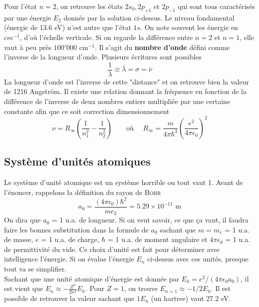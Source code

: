 	Pour l'état $n=2$, on retrouve les états $2s_0, 2p_{+1}$ et $2p_{-1}$ qui sont tous caractérisés par
	une énergie $E_2$ donnée par la solution ci-dessus. Le niveau fondamental (énergie de 13.6 eV) n'est 
	autre que l'état $1s$. On note souvent les énergie en $cm^{-1}$, d'où l'échelle verticale. Si on regarde
	la différence entre $n=2$ et $n=1$, elle vaut à peu près $100'000$ cm$^{-1}$. Il s'agit du \textbf{
	nombre d'onde} défini comme l'inverse de la longueur d'onde. Plusieurs écritures sont possibles
	\begin{equation}
	\frac{1}{\lambda}\equiv \bar\lambda = \sigma = \bar\nu
	\end{equation}
	La longueur d'onde est l'inverse de cette "distance" et on retrouve bien la valeur de 1216 Angström. 
	Il existe une relation donnant la fréquence en fonction de la différence de l'inverse de deux nombres 
	entiers multipliée par une certaine constante afin que ce soit correction dimensionnement
	\begin{equation}
	\nu = R_\infty\left(\frac{1}{n_1^2}-\frac{1}{n_2^2}\right)\qquad\text{où }\quad R_\infty = \frac{m}{
	4\pi\hbar^3}\left(\frac{e^2}{4\pi\epsilon_0}\right)^2
	\end{equation}
	

\subsection{Système d'unités atomiques}
Le système d'unité atomique est un système horrible ou tout vaut 1. Avant de l'énoncer, rappelons la 
définition du rayon de \textsc{Bohr}
\begin{equation}
a_0=\frac{(4\pi\epsilon_0)\hbar^2}{me_2} = 5.29\times 10^{-11}\text{ m}
\end{equation}
On dira que $a_0$ = 1 u.a. de longueur. Si on veut savoir, ce que ça vaut, il faudra faire les bonnes
substitution dans la formule de $a_0$ sachant que
$m=m_e$ = 1 u.a. de masse, $e$ = 1 u.a. de charge, $\hbar$ = 1 u.a. de moment angulaire et $4\pi\epsilon_0$ =
1 u.a.  de permittivité du vide. Ce choix d'unité est fait pour déterminer avec intelligence l'énergie. Si on 
évalue l'énergie $E_n$ ci-dessus avec ces unités, presque tout va se simplifier.\\

Sachant que une unité atomique d'énergie est donnée par $E_h = e^2/(4\pi\epsilon_0 a_0)$, il est vient que
$E_n \approx -\frac{Z^2}{2n^2}E_h$. Pour $Z=1$, on trouve $E_{n=1} \approx -1/2 E_h$. Il est possible de 
retrouver la valeur sachant que $1 E_h$ (un hartree) vaut 27.2 eV.\\

